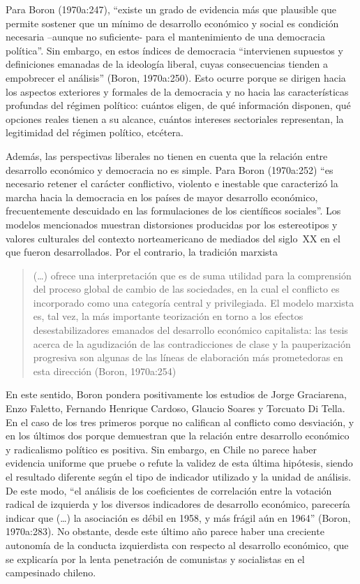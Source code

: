 Para Boron (1970a:247), ``existe un grado de evidencia más que plausible que permite sostener que un mínimo de desarrollo económico y social es condición necesaria --aunque no suficiente- para el mantenimiento de una democracia política''. Sin embargo, en estos índices de democracia ``intervienen supuestos y definiciones emanadas de la ideología liberal, cuyas consecuencias tienden a empobrecer el análisis'' (Boron, 1970a:250). Esto ocurre porque se dirigen hacia los aspectos exteriores y formales de la democracia y no hacia las características profundas del régimen político: cuántos eligen, de qué información disponen, qué opciones reales tienen a su alcance, cuántos intereses sectoriales representan, la legitimidad del régimen político, etcétera.

Además, las perspectivas liberales no tienen en cuenta que la relación entre desarrollo económico y democracia no es simple. Para Boron (1970a:252) ``es necesario retener el carácter conflictivo, violento e inestable que caracterizó la marcha hacia la democracia en los países de mayor desarrollo económico, frecuentemente descuidado en las formulaciones de los científicos sociales''. Los modelos mencionados muestran distorsiones producidas por los estereotipos y valores culturales del contexto norteamericano de mediados del siglo~XX en el que fueron desarrollados. Por el contrario, la tradición marxista

\begin{quote}
(\dots) ofrece una interpretación que es de suma utilidad para la comprensión del proceso global de cambio de las sociedades, en la cual el conflicto es incorporado como una categoría central y privilegiada. El modelo marxista es, tal vez, la más importante teorización en torno a los efectos desestabilizadores emanados del desarrollo económico capitalista: las tesis acerca de la agudización de las contradicciones de clase y la pauperización progresiva son algunas de las líneas de elaboración más prometedoras en esta dirección (Boron, 1970a:254)
\end{quote}

En este sentido, Boron pondera positivamente los estudios de Jorge Graciarena, Enzo Faletto, Fernando Henrique Cardoso, Glaucio Soares y Torcuato Di Tella. En el caso de los tres primeros porque no califican al conflicto como desviación, y en los últimos dos porque demuestran que la relación entre desarrollo económico y radicalismo político es positiva. Sin embargo, en Chile no parece haber evidencia uniforme que pruebe o refute la validez de esta última hipótesis, siendo el resultado diferente según el tipo de indicador utilizado y la unidad de análisis. De este modo, ``el análisis de los coeficientes de correlación entre la votación radical de izquierda y los diversos indicadores de desarrollo económico, parecería indicar que (\dots) la asociación es débil en 1958, y más frágil aún en 1964'' (Boron, 1970a:283). No obstante, desde este último año parece haber una creciente autonomía de la conducta izquierdista con respecto al desarrollo económico, que se explicaría por la lenta penetración de comunistas y socialistas en el campesinado chileno.

